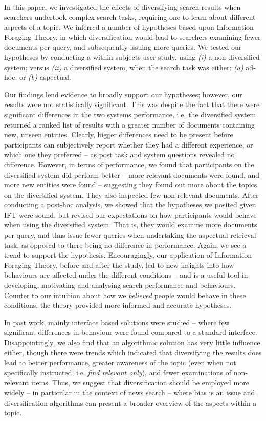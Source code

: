 In this paper, we investigated the effects of diversifying search results when searchers undertook complex search tasks, requiring one to learn about different aspects of a topic. We inferred a number of hypotheses based upon Information Foraging Theory, in which diversification would lead to searchers examining fewer documents per query, and subsequently issuing more queries. We tested our hypotheses by conducting a within-subjects user study, using \emph{(i)} a non-diversified system; versus \emph{(ii)} a diversified system, when the search task was either: \emph{(a)} ad-hoc; or \emph{(b)} aspectual.

Our findings lend evidence to broadly support our hypotheses; however, our results were not statistically significant. This was despite the fact that there were significant differences in the two systems performance, i.e. the diversified system returned a ranked list of results with a greater number of documents containing new, unseen entities. Clearly, bigger differences need to be present before participants can subjectively report whether they had a different experience, or which one they preferred -- as post task and system questions revealed no difference. However, in terms of performance, we found that participants on the diversified system did perform better -- more relevant documents were found, and more new entities were found -- suggesting they found out more about the topics on the diversified system. They also inspected few non-relevant documents. After conducting a post-hoc analysis, we showed that the hypotheses we posited given IFT were sound, but revised our expectations on how participants would behave when using the diversified system. That is, they would examine more documents per query, and thus issue fewer queries when undertaking the aspectual retrieval task, as opposed to there being no difference in performance. Again, we see a trend to support the hypothesis. Encouragingly, our application of Information Foraging Theory, before and after the study, led to new insights into how behaviours are affected under the different conditions -- and is a useful tool in developing, motivating and analysing search performance and behaviours. Counter to our intuition about how we \emph{believed} people would behave in these conditions, the theory provided more informed and accurate hypotheses.

In past work, mainly interface based solutions were studied -- where few significant differences in behaviour were found compared to a standard interface. Disappointingly, we also find that an algorithmic solution has very little influence either, though there were trends which indicated that diversifying the results does lead to better performance, greater awareness of the topic (even when not specifically instructed, i.e. \textit{find relevant only}), and fewer examinations of non-relevant items. Thus, we suggest that diversification should be employed more widely -- in particular in the context of news search -- where bias is an issue and diversification algorithms can present a broader overview of the aspects within a topic. 

